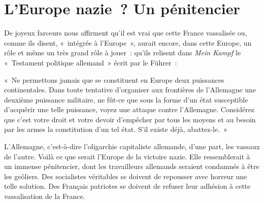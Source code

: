 \documentclass[french,twoside]{book} %
\newenvironment{quoteblock}%
  {\begin{quoting}}
  {\end{quoting}}
\newenvironment{quotebar}{%
    \def\FrameCommand{{\color{rubric!10!}\vrule width 0.5em} \hspace{0.9em}}%
    \def\OuterFrameSep{\itemsep} %
    \MakeFramed {\advance\hsize-\width \FrameRestore}
  }%
  {%
    \endMakeFramed
  }
\renewenvironment{quoteblock}%
  {%
    \savenotes
    \setstretch{0.9}
    \normalfont
    \begin{quotebar}
  }
  {%
    \end{quotebar}
    \spewnotes
  }
\begin{document}
\section[{L’Europe nazie ? Un pénitencier}]{L’Europe nazie ? Un pénitencier}
\noindent De joyeux farceurs nous affirment qu’il est vrai que cette France vassalisée ou, comme ils disent, « intégrée à l’Europe », aurait encore, dans cette Europe, un rôle et même un très grand rôle à jouer : qu’ils relisent dans \emph{Mein Kampf} le « Testament politique allemand » écrit par le Führer :\par

\begin{quoteblock}
 \noindent « Ne permettons jamais que se constituent en Europe deux puissances continentales. Dans toute tentative d’organiser aux frontières de l’Allemagne une deuxième puissance militaire, ne fût-ce que sous la forme d’un état susceptible d’acquérir une telle puissance, voyez une attaque contre l’Allemagne. Considérez que c’est votre droit et votre devoir d’empêcher par tous les moyens et au besoin par les armes la constitution d’un tel état. S’il existe déjà, abattez-le. »
 \end{quoteblock}

\noindent L’Allemagne, c’est-à-dire l’oligarchie capitaliste allemande, d’une part, les vassaux de l’autre. Voilà ce que serait l’Europe de la victoire nazie. Elle ressemblerait à un immense pénitencier, dont les travailleurs allemands seraient condamnés à être les geôliers. Des socialistes véritables se doivent de repousser avec horreur une telle solution. Des Français patriotes se doivent de refuser leur adhésion à cette vassalisation de la France.
\end{document}
